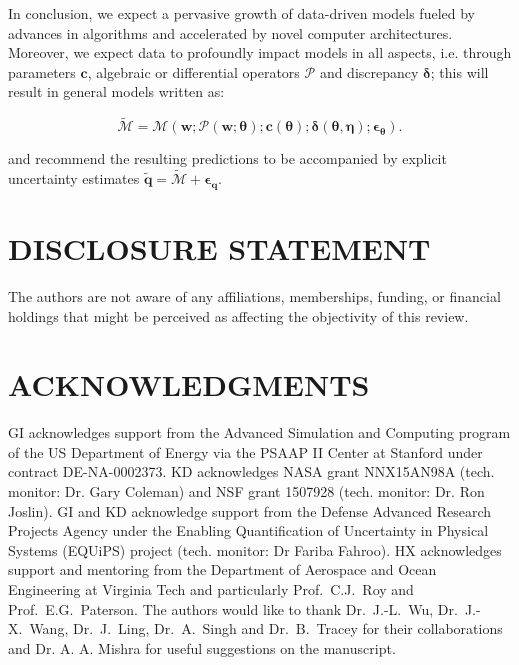 \documentclass[a4paper]{ar-1col}
\begin{document}
In conclusion, we expect a pervasive growth of data-driven models fueled by advances in algorithms and accelerated by novel computer architectures. Moreover, we expect data to profoundly impact
models in  all aspects, i.e.  through parameters $\mathbf{c}$, algebraic or differential operators $\mathcal{P}$ and discrepancy $\bm{\delta}$; this will result in general models written as: 

  \begin{equation}
 \widetilde{ \mathcal M} = \mathcal M (   \mathbf{w}; \mathcal P(  \mathbf{w}; \bm{\theta}  );    \mathbf{c}(\bm{\theta});   \bm{\delta}{(\bm{\theta},\bm{\eta})};   \bm{\epsilon}_{\bm{\theta}}  ).   
 \label{eq:datadrivenfinal} 
 \end{equation}

\noindent and recommend the resulting predictions to be accompanied by explicit uncertainty estimates $\widetilde{\mathbf{q}} = \mathbf{  \widetilde{ \mathcal M}  } + \bm{\epsilon}_{\mathbf{q}}$.
 


\section*{DISCLOSURE STATEMENT}
The authors are not aware of any affiliations, memberships, funding, or financial holdings that
might be perceived as affecting the objectivity of this review. 

\section*{ACKNOWLEDGMENTS}
GI acknowledges support from the Advanced Simulation and Computing program of the US Department of Energy via the PSAAP II Center at Stanford under contract DE-NA-0002373. KD acknowledges NASA grant NNX15AN98A (tech. monitor: Dr. Gary Coleman) and  NSF  grant 1507928 (tech. monitor: Dr. Ron Joslin). GI and KD acknowledge support from the Defense Advanced Research Projects Agency under the Enabling Quantification of Uncertainty in Physical Systems (EQUiPS) project (tech. monitor: Dr Fariba Fahroo). HX acknowledges  support and mentoring from the Department of Aerospace and Ocean Engineering at Virginia Tech and particularly Prof.\ C.J.~Roy and Prof.\ E.G.~Paterson.
The authors would like to thank Dr.\ J.-L.~Wu, Dr.\ J.-X.~Wang,  Dr.\ J.~Ling, Dr.\ A.~Singh and Dr.\ B.~Tracey for their collaborations and Dr. A. A. Mishra for useful suggestions on the manuscript.
\end{document}

